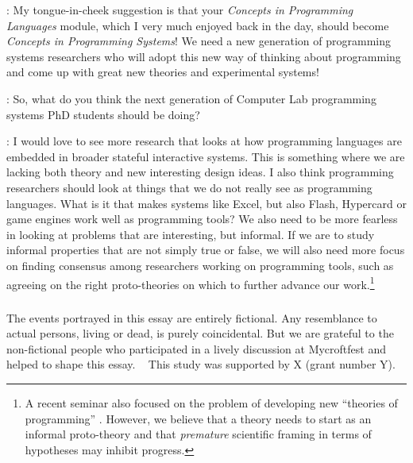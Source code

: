 \documentclass[runningheads]{llncs}
\newcommand{\T}{Tomas}
\newcommand{\J}{Joel}
\newcommand{\says}[2][gg]{\vspace{0.5em}\noindent\hangindent=0.5cm{\textsc{#1}}: #2}
\begin{document}
\says[\T]{My tongue-in-cheek suggestion is that your
\emph{Concepts in Programming Languages} module, which I very much enjoyed back in the day, should become
\emph{Concepts in Programming Systems}! We need a new generation of programming systems researchers who will adopt this new way of thinking about programming and come up with great new theories and experimental systems!}

\says[Alan]{So, what do you think the next generation of Computer Lab programming systems PhD students should be doing?}

\says[\J]{I would love to see more research that looks at how programming languages are embedded in broader stateful interactive systems. This is something where we are lacking both theory and new interesting design ideas. I also think programming researchers should look at things that we do not really see as programming languages. What is it that makes systems like Excel, but also Flash, Hypercard or game engines work well as programming tools? We also need to be more fearless in looking at problems that are interesting, but informal. If we are to study informal properties that are not simply true or false, we will also need more focus on finding consensus among researchers working on programming tools, such as agreeing on the right proto-theories on which to further advance our work.\footnote{A recent seminar also focused on the problem of developing new ``theories of programming'' \cite{latoza-2023-theories}. However, we believe that a theory needs to start as an informal proto-theory and that \emph{premature} scientific framing in terms of hypotheses may inhibit progress.}}

\begin{credits}
\subsubsection{\ackname}
The events portrayed in this essay are entirely fictional. Any resemblance to actual persons, living or dead, is purely coincidental. But we are grateful to the non-fictional people who participated in a lively discussion at Mycroftfest and helped to shape this essay.
~
This study was supported by X (grant number Y).
\end{credits}



\end{document}
